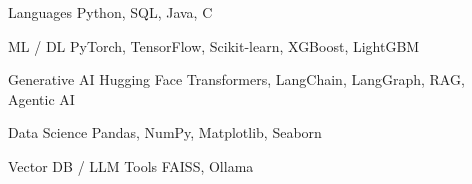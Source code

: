 
\begin{cvskills}

  \cvskill
    {Languages}
    {Python, SQL, Java, C}

  \cvskill
    {ML / DL}
    {PyTorch, TensorFlow, Scikit-learn, XGBoost, LightGBM}

  \cvskill
    {Generative AI}
    {Hugging Face Transformers, LangChain, LangGraph, RAG, Agentic AI}

  \cvskill
    {Data Science}
    {Pandas, NumPy, Matplotlib, Seaborn}

  \cvskill
    {Vector DB / LLM Tools}
    {FAISS, Ollama}

\end{cvskills}